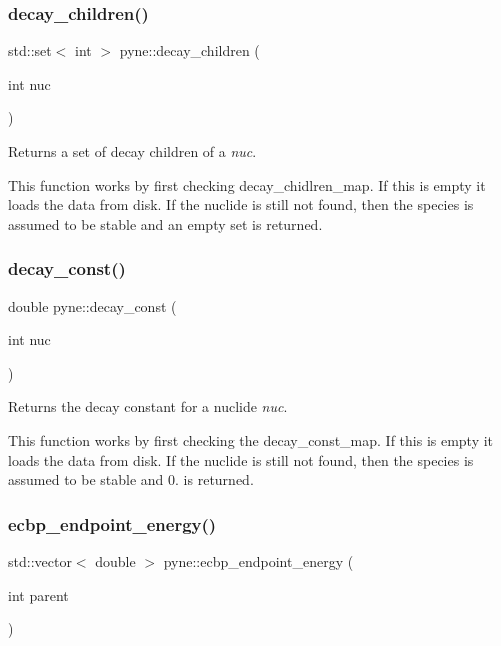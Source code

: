 \subsubsection{\texorpdfstring{decay\+\_\+children()}{decay\_children()}}
{\footnotesize\ttfamily std\+::set$<$ int $>$ pyne\+::decay\+\_\+children (\begin{DoxyParamCaption}\item[{int}]{nuc }\end{DoxyParamCaption})}



Returns a set of decay children of a {\itshape nuc}. 

This function works by first checking decay\+\_\+chidlren\+\_\+map. If this is empty it loads the data from disk. If the nuclide is still not found, then the species is assumed to be stable and an empty set is returned. \mbox{\label{namespacepyne_a6b87e11fea0c2167cd19eb62c21b12b2}} 
\subsubsection{\texorpdfstring{decay\+\_\+const()}{decay\_const()}}
{\footnotesize\ttfamily double pyne\+::decay\+\_\+const (\begin{DoxyParamCaption}\item[{int}]{nuc }\end{DoxyParamCaption})}



Returns the decay constant for a nuclide {\itshape nuc}. 

This function works by first checking the decay\+\_\+const\+\_\+map. If this is empty it loads the data from disk. If the nuclide is still not found, then the species is assumed to be stable and 0. is returned. \mbox{\label{namespacepyne_a01290076b747cd8f6fb8785d698d9319}} 
\subsubsection{\texorpdfstring{ecbp\+\_\+endpoint\+\_\+energy()}{ecbp\_endpoint\_energy()}}
{\footnotesize\ttfamily std\+::vector$<$ double $>$ pyne\+::ecbp\+\_\+endpoint\+\_\+energy (\begin{DoxyParamCaption}\item[{int}]{parent }\end{DoxyParamCaption})}

